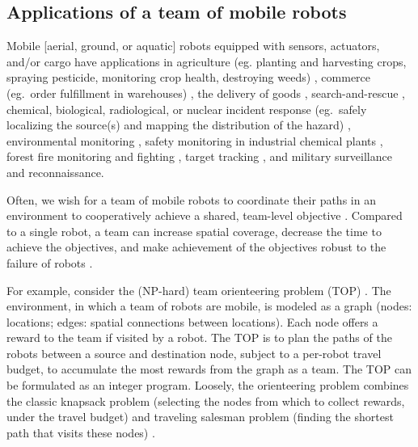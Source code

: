 \documentclass[11pt, oneside]{article}
\begin{document}
\subsection{Applications of a team of mobile robots}
Mobile [aerial, ground, or aquatic] robots equipped with sensors, actuators, and/or cargo have applications in agriculture (eg. planting and harvesting crops, spraying pesticide, monitoring crop health, destroying weeds) \cite{santos2020path,bawden2017robot,mcallister2018multi}, commerce (eg.\ order fulfillment in warehouses) \cite{wurman2008coordinating}, the delivery of goods \cite{coelho2014thirty}, search-and-rescue \cite{queralta2020collaborative,rouvcek2020darpa}, chemical, biological, radiological, or nuclear incident response (eg.\ safely localizing the source(s) and mapping the distribution of the hazard) \cite{murphy2012projected,hutchinson2019unmanned}, environmental monitoring \cite{dunbabin2012robots,hernandez2012mobile,yuan2020maritime}, safety monitoring in industrial chemical plants \cite{soldan2014towards,francis2022gas}, forest fire monitoring and fighting \cite{merino2012unmanned}, target tracking \cite{robin2016multi}, and military surveillance and reconnaissance. 

Often, we wish for a team of mobile robots to coordinate their paths in an environment to cooperatively achieve a shared, team-level objective \cite{parker1995design,parker2007distributed}.
Compared to a single robot, a team can increase spatial coverage, decrease the time to achieve the objectives, and make achievement of the objectives robust to the failure of robots \cite{schranz2020swarm,brambilla2013swarm}.


For example, consider the (NP-hard) team orienteering \cite{golden1987orienteering} problem (TOP) \cite{chao1996team,gunawan2016orienteering,vansteenwegen2011orienteering}. 
The environment, in which a team of robots are mobile, is modeled as a graph (nodes: locations; edges: spatial connections between locations). Each node offers a reward to the team if visited by a robot.
The TOP is to plan the paths of the robots between a source and destination node, subject to a per-robot travel budget, to accumulate the most rewards from the graph as a team. The TOP can be formulated as an integer program. Loosely, the orienteering problem combines the classic knapsack problem (selecting the nodes from which to collect rewards, under the travel budget) and traveling salesman problem (finding the shortest path that visits these nodes) \cite{vansteenwegen2011orienteering}.
\end{document}
